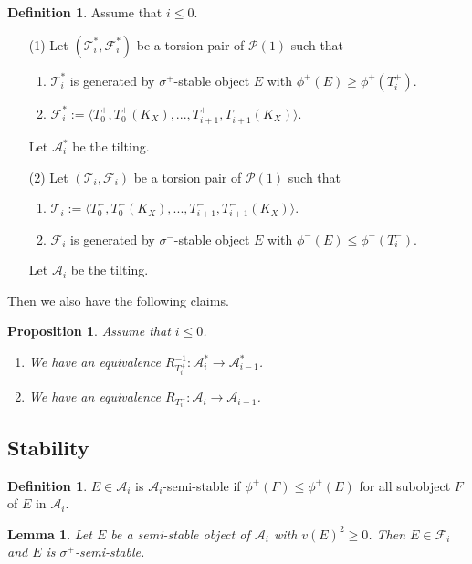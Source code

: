 \documentclass[leqno,11pt]{amsart}
\newtheorem{Prop}[Thm]{Proposition}
\newtheorem{Lem}[Thm]{Lemma}
\theoremstyle{definition}
\newtheorem{Def}[Thm]{Definition}
\def\AA{\ensuremath{\mathcal A}}
\def\FF{\ensuremath{\mathcal F}}
\def\PP{\ensuremath{\mathcal P}}
\def\TT{\ensuremath{\mathcal T}}
\begin{document}
\begin{Def}
Assume that $i \leq 0$.
\begin{enumerate}
\item[(1)]
Let $(\TT_i^*,\FF_i^*)$ be a torsion pair of $\PP(1)$ such that
\begin{enumerate}
\item
$\TT_i^*$ is generated by $\sigma^+$-stable object $E$ with 
$\phi^+(E) \geq \phi^+(T_i^+)$.
\item
$\FF_i^*:=\langle T_0^+,T_0^+ (K_X),...,T_{i+1}^+, T_{i+1}^+ (K_X) \rangle$.
\end{enumerate}
Let $\AA_i^*$ be the tilting.
\item[(2)]
Let $(\TT_i,\FF_i)$ be a torsion pair of $\PP(1)$ such that
\begin{enumerate}
\item
$\TT_i:=\langle T_0^-,T_0^- (K_X),...,T_{i+1}^-, T_{i+1}^- (K_X) \rangle$.
\item
$\FF_i$ is generated by $\sigma^-$-stable object $E$ with 
$\phi^-(E) \leq \phi^-(T_i^-)$.
\end{enumerate}
Let $\AA_i$ be the tilting.
\end{enumerate}
\end{Def}


Then we also have the following claims.
\begin{Prop}\label{Prop:equiv3}
Assume that $i \leq 0$.
\begin{enumerate}
\item
We have an equivalence
$R_{T_i^+}^{-1}:\AA_i^* \to \AA_{i-1}^*$.
\item
We have an equivalence
$R_{T_i^-}:\AA_i \to \AA_{i-1}$.
\end{enumerate}
\end{Prop}







\subsection{Stability}


\begin{Def}
$E \in \AA_i$ is $\AA_i$-semi-stable if
$\phi^+(F) \leq \phi^+(E)$ for all subobject $F$ of $E$
in $\AA_i$.
\end{Def}

\begin{Lem}
Let $E$ be a semi-stable object of $\AA_i$
with $v(E)^2 \geq 0$.
Then $E \in \FF_i$ and $E$ is $\sigma^+$-semi-stable.
\end{Lem}
\end{document}
